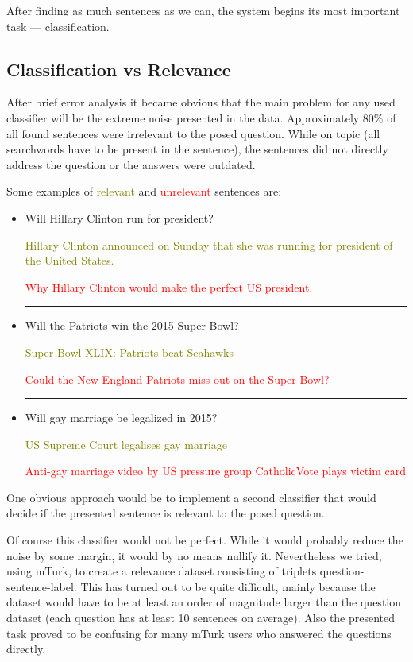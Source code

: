 \documentclass[11pt,a4paper]{article}
\begin{document}
After finding as much sentences as we can, the system begins its most important task --- classification.

\subsection{Classification vs Relevance}

After brief error analysis it became obvious that the main problem for any used classifier will be the extreme noise presented in the data. Approximately 80\% of all found sentences were irrelevant to the posed question. While on topic (all searchwords have to be present in the sentence), 
the sentences did not directly address the question or the answers were outdated.

Some examples of \textcolor{olive}{relevant} and \textcolor{red}{unrelevant} sentences are:

\begin{itemize}

\item Will Hillary Clinton run for president?

\textcolor{olive}{Hillary Clinton announced on Sunday that she was running for president of the United States.}

\textcolor{red}{Why Hillary Clinton would make the perfect US president.}

\noindent\rule{8cm}{0.4pt}

\item Will the Patriots win the 2015 Super Bowl?

\textcolor{olive}{Super Bowl XLIX: Patriots beat Seahawks}

\textcolor{red}{Could the New England Patriots miss out on the Super Bowl?}

\noindent\rule{8cm}{0.4pt}

\item Will gay marriage be legalized in 2015?

\textcolor{olive}{US Supreme Court legalises gay marriage}

\textcolor{red}{Anti-gay marriage video by US pressure group CatholicVote plays victim card}

\end{itemize}

One obvious approach would be to implement a second classifier that would decide if the presented sentence is relevant to the posed question. 

Of course this classifier would not be perfect. While it would probably reduce the noise by some margin, it would by no means nullify it. Nevertheless we tried, using mTurk, to create a relevance dataset consisting of triplets question-sentence-label. This has turned out to be quite difficult, mainly because the dataset would have to be at least an order of magnitude larger than the question dataset (each question has at least 10 sentences on average).
Also the presented task proved to be confusing for many mTurk users who answered the questions directly.
\end{document}
